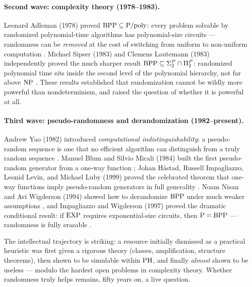 \paragraph{Second wave: complexity theory (1978--1983).} Leonard Adleman (1978) proved $\text{BPP} \subseteq \text{P}/\text{poly}$: every problem solvable by randomized polynomial-time algorithms has polynomial-size circuits --- randomness can be \emph{removed} at the cost of switching from uniform to non-uniform computation \cite{Adleman1978}. Michael Sipser (1983) and Clemens Lautemann (1983) independently proved the much sharper result $\text{BPP} \subseteq \Sigma_2^P \cap \Pi_2^P$: randomized polynomial time sits inside the second level of the polynomial hierarchy, not far above $\text{NP}$ \cite{Sipser1983,Lautemann1983}. These results established that randomization cannot be wildly more powerful than nondeterminism, and raised the question of whether it is powerful at all.

\paragraph{Third wave: pseudo-randomness and derandomization (1982--present).} Andrew Yao (1982) introduced \emph{computational indistinguishability}: a pseudo-random sequence is one that no efficient algorithm can distinguish from a truly random sequence \cite{Yao1982}. Manuel Blum and Silvio Micali (1984) built the first pseudo-random generator from a one-way function \cite{BlumMicali1984}; Johan H{\aa}stad, Russell Impagliazzo, Leonid Levin, and Michael Luby (1999) proved the celebrated theorem that one-way functions imply pseudo-random generators in full generality \cite{HastadImpagliazzoLevinLuby1999}. Noam Nisan and Avi Wigderson (1994) showed how to derandomize $\text{BPP}$ under much weaker assumptions \cite{NisanWigderson1994}, and Impagliazzo and Wigderson (1997) proved the dramatic conditional result: if $\text{EXP}$ requires exponential-size circuits, then $\text{P} = \text{BPP}$ --- randomness is fully erasable \cite{ImpagliazzoWigderson1997}.

The intellectual trajectory is striking: a resource initially dismissed as a practical heuristic was first given a rigorous theory (classes, amplification, structure theorems), then shown to be simulable within $\text{PH}$, and finally \emph{almost} shown to be useless --- modulo the hardest open problems in complexity theory. Whether randomness truly helps remains, fifty years on, a live question.

